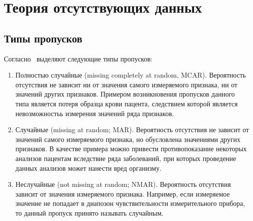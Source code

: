 \chapter{Теория отсутствующих данных} \label{chapt1}

\section{Типы пропусков} \label{sect1_1}

Согласно~\cite{little2002statistical} выделяют следующие типы
пропусков:
\begin{enumerate}
  \item Полностью случайные (missing completely at random,
    MCAR). Вероятность отсутствия не зависит ни от значения самого
    измеряемого признака, ни от значений других признаков. Примером
    возникновения пропусков данного типа является потеря образца крови
    пацента, следствием которой является невозможностьь измерения значений
    ряда признаков.
  \item Случайные (missing at random; MAR). Вероятность отсутствия не
    зависит от значений самого измеряемого признака, но обусловлена
    значениями других признаков. В качестве примера можно привести
    противопоказание некоторых анализов пацентам вследствие ряда
    заболеваний, при которых проведение данных анализов может нанести вред
    организму.
  \item Неслучайные (not missing at random; NMAR). Вероятность
    отсутствия зависит от значения измеряемого признака. Например, если
    измеряемое значение не попадает в диапозон чувствительности
    измерительного прибора, то данный пропуск принято называть случайным.
\end{enumerate}
